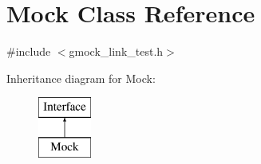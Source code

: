 \hypertarget{classMock}{}\section{Mock Class Reference}
\label{classMock}


{\ttfamily \#include $<$gmock\+\_\+link\+\_\+test.\+h$>$}

Inheritance diagram for Mock\+:\begin{figure}[H]
\begin{center}
\leavevmode
\includegraphics[height=2.000000cm]{classMock}
\end{center}
\end{figure}
